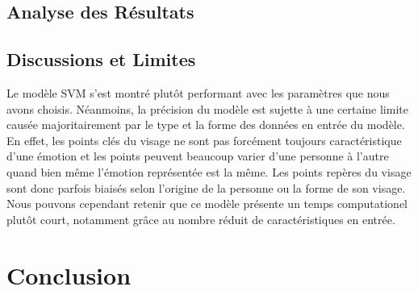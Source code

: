 \documentclass{rapport}
\begin{document}
\subsection{Analyse des Résultats}

\subsection{Discussions et Limites}

Le modèle SVM s'est montré plutôt performant avec les paramètres que nous avons choisis. Néanmoins, la précision du modèle est sujette à une certaine limite causée
majoritairement par le type et la forme des données en entrée du modèle. En effet, les points clés du visage ne sont pas forcément toujours caractéristique d'une émotion
et les points peuvent beaucoup varier d'une personne à l'autre quand bien même l'émotion représentée est la même. Les points repères du visage sont donc parfois biaisés selon
l'origine de la personne ou la forme de son visage. Nous pouvons cependant retenir que ce modèle présente un temps computationel plutôt court, notamment grâce au nombre réduit
de caractéristiques en entrée.

\section{Conclusion}



\end{document}
